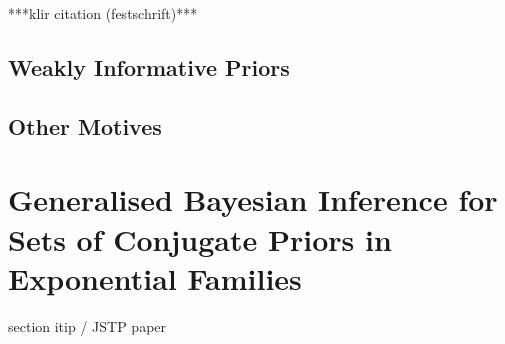 ***klir citation (festschrift)***

\subsection{\pdc }

\subsection{Weakly Informative Priors}
\label{sec:motivation:near-ignorance}

\subsection{Other Motives}


\section{Generalised Bayesian Inference for Sets of Conjugate Priors in Exponential Families}
\label{sec:imprecisebayes-conjugate}

section itip / JSTP paper



